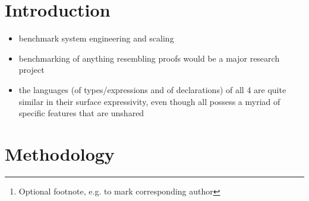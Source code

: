 \documentclass[a4paper,UKenglish,cleveref, autoref, thm-restate,anonymous]{lipics-v2021}
\title{\panbench} %
\author{Jane {Open Access}}{Dummy University Computing Laboratory, [optional: Address], Country \and My second affiliation, Country \and \url{http://www.myhomepage.edu} }{johnqpublic@dummyuni.org}{https://orcid.org/0000-0002-1825-0097}{(Optional) author-specific funding acknowledgements}%
\author{Joan R. Public\footnote{Optional footnote, e.g. to mark corresponding author}}{Department of Informatics, Dummy College, [optional: Address], Country}{joanrpublic@dummycollege.org}{[orcid]}{[funding]}
\begin{document}
\maketitle

\begin{abstract}
We benchmark four proof assistants (Agda, Idris, Lean and Rocq) through a
single test suite. We focus our benchmarks on the basic features that all
systems based on a similar foundations (dependent type theory) have in common.
We do this by creating an ``over language'' in which to express all the
information we need to be able to output \emph{correct and idiomatic syntax}
for each of our targets. Our benchmarks further focus on ``basic engineering''
of these systems: how do they handle long identifiers, long lines, large
records, large data declarations, and so on.

Our benchmarks reveals both flaws and successes in all systems. We give a
thorough analysis of the results.

We also detail the design of our extensible system. It is designed so that
additional tests and additional system versions can easily be added. While
adding more systems requires more work, the system is also designed to be
extended in this manner.
\end{abstract}

\section{Introduction}
\label{sec:intro}

\begin{itemize}
\item benchmark system engineering and scaling
\item benchmarking of anything resembling proofs would be a major research
project
\item the languages (of types/expressions and of declarations) of all 4
are quite similar in their surface expressivity, even though all possess a
myriad of specific features that are unshared
\end{itemize}

\section{Methodology}
\label{sec:method}

\end{document}

